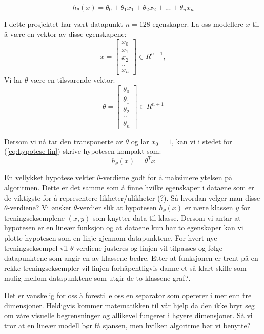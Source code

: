 \begin{equation}
h_\theta(x) = \theta_0 + \theta_1x_1 + \theta_2x_2 + ... + \theta_nx_n
\label{eq:hypotese-lin}
\end{equation}

I dette prosjektet har vært datapunkt $n = 128$ egenskaper. La oss modellere $x$ til å være en vektor av disse egenskapene: 
\[
x =
\begin{bmatrix}
x_0 \\
x_1 \\
x_2 \\
.. \\
x_n
\end{bmatrix}
\in R^{n+1},
\]
Vi lar $\theta$ være en tilsvarende vektor: 
\[
\theta =
\begin{bmatrix}
\theta_0 \\
\theta_1 \\
\theta_2 \\
.. \\
\theta_n
\end{bmatrix}
\in R^{n+1}
\]

Dersom vi nå tar den transponerte av $\theta$ og lar \(x_0 = 1\), kan vi i stedet for (\ref{eq:hypotese-lin}) skrive hypotesen kompakt som:
\begin{equation}
h_\theta(x) = \theta^{T}x
\label{eq:hypotese-kompakt}
\end{equation}

En vellykket hypotese vekter $\theta$-verdiene godt for å maksimere ytelsen på algoritmen. Dette er det samme som å finne hvilke egenskaper i dataene som er de viktigste for å representere likheter/ulikheter (?). Så hvordan velger man disse $\theta$-verdiene? Vi ønsker $\theta$-verdier slik at hypotesen \(h_\theta(x)\) er nære klassen $y$ for treningseksemplene \((x,y)\) som knytter data til klasse. Dersom vi antar at hypotesen er en lineær funksjon og at dataene kun har to egenskaper kan vi plotte hypotesen som en linje gjennom datapunktene. For hvert nye treningseksempel vil $\theta$-verdiene justeres og linjen vil tilpasses og følge datapunktene som angir en av klassene bedre. Etter at funksjonen er trent på en rekke treningseksempler vil linjen forhåpentligvis danne et så klart skille som mulig mellom datapunktene som utgir de to klassene {\color{red} graf?}.

Det er vanskelig for oss å forestille oss en separator som opererer i mer enn tre dimensjoner. Heldigvis kommer matematikken til vår hjelp da den ikke bryr seg om våre visuelle begrensninger og allikevel fungerer i høyere dimensjoner. Så vi tror at en lineær modell bør få sjansen, men hvilken algoritme bør vi benytte? 

